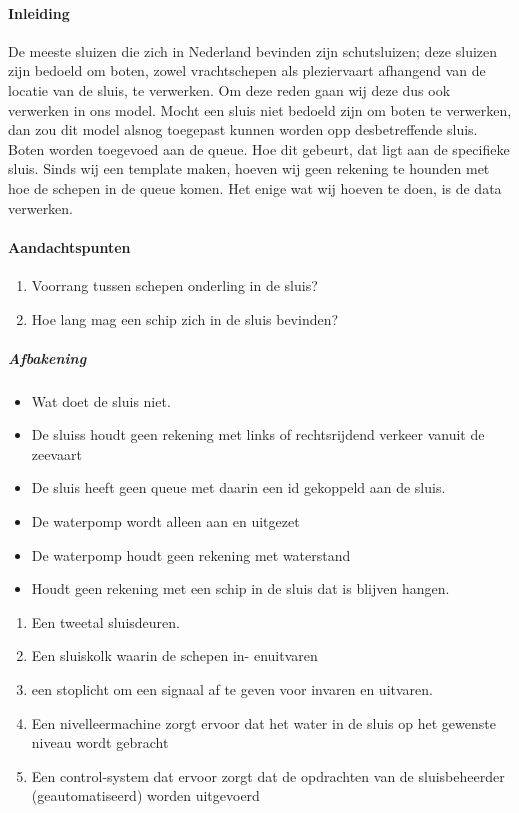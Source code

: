  


\paragraph{Inleiding}




De meeste sluizen die zich in Nederland bevinden zijn schutsluizen; deze sluizen zijn bedoeld om boten, zowel vrachtschepen als pleziervaart afhangend van de locatie van de sluis, te verwerken. Om deze reden gaan wij deze dus ook verwerken in ons model. Mocht een sluis niet bedoeld zijn om boten te verwerken, dan zou dit model alsnog toegepast kunnen worden opp desbetreffende sluis.
Boten worden toegevoed aan de queue. Hoe dit gebeurt, dat ligt aan de specifieke sluis.  Sinds wij een template maken, hoeven wij geen rekening te hounden met hoe de schepen in de queue komen. Het enige wat wij hoeven te doen, is de data verwerken.





\paragraph{Aandachtspunten}
\begin{enumerate}
	\item Voorrang tussen schepen onderling in de sluis?
	\item Hoe lang mag een schip zich in de sluis bevinden?
\end{enumerate} 




\subparagraph{Afbakening}
\begin{itemize}
	\item Wat doet de sluis niet.
	\item De sluiss houdt geen rekening met links of rechtsrijdend verkeer vanuit de zeevaart
	\item De sluis heeft geen queue met daarin een id gekoppeld aan de sluis.
	\item De waterpomp wordt alleen aan en uitgezet
	\item De waterpomp houdt geen rekening met waterstand
	\item Houdt geen rekening met een schip in de sluis dat is blijven hangen.
\end{itemize}


\begin{enumerate}
	\item Een tweetal sluisdeuren. 
	\item Een sluiskolk waarin de schepen in- enuitvaren
	\item een stoplicht om een signaal af te geven voor invaren en uitvaren.
	\item Een nivelleermachine zorgt ervoor dat het water in de sluis op het gewenste niveau wordt gebracht
	\item Een control-system dat ervoor zorgt dat de opdrachten van de sluisbeheerder (geautomatiseerd) worden uitgevoerd
\end{enumerate}

